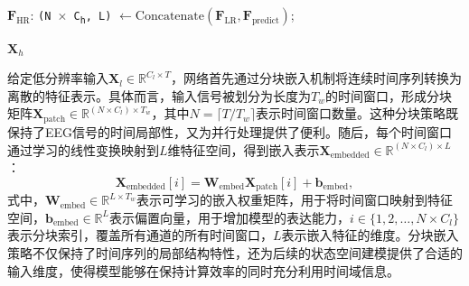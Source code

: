 \begin{algorithm}[htbp]
{    $\mathbf{F}_{\text{HR}}$:  {\texttt{(N $\times$ C\textsubscript{h}, L)}} $\leftarrow \text{Concatenate}(\mathbf{F}_{\text{LR}}, \mathbf{F}_{\text{predict}})$;
}


\Return $\mathbf{X}_h$\;
\end{algorithm}


给定低分辨率输入$\mathbf{X}_l \in \mathbb{R}^{C_l \times T}$，网络首先通过分块嵌入机制将连续时间序列转换为离散的特征表示。具体而言，输入信号被划分为长度为$T_w$的时间窗口，形成分块矩阵$\mathbf{X}_{\text{patch}} \in \mathbb{R}^{(N \times C_l) \times T_w}$，其中$N = \lceil T/T_w \rceil$表示时间窗口数量。这种分块策略既保持了EEG信号的时间局部性，又为并行处理提供了便利。随后，每个时间窗口通过学习的线性变换映射到$L$维特征空间，得到嵌入表示$\mathbf{X}_{\text{embedded}} \in \mathbb{R}^{(N \times C_l) \times L}$：
\begin{equation}
\mathbf{X}_{\text{embedded}}[i] = \mathbf{W}_{\text{embed}} \mathbf{X}_{\text{patch}}[i] + \mathbf{b}_{\text{embed}},
\label{eq:patch_embedding}
\end{equation}
式中，$\mathbf{W}_{\text{embed}} \in \mathbb{R}^{L \times T_w}$表示可学习的嵌入权重矩阵，用于将时间窗口映射到特征空间，$\mathbf{b}_{\text{embed}} \in \mathbb{R}^{L}$表示偏置向量，用于增加模型的表达能力，$i \in \{1, 2, \ldots, N \times C_l\}$表示分块索引，覆盖所有通道的所有时间窗口，$L$表示嵌入特征的维度。分块嵌入策略不仅保持了时间序列的局部结构特性，还为后续的状态空间建模提供了合适的输入维度，使得模型能够在保持计算效率的同时充分利用时间域信息。

